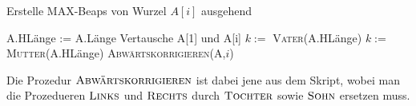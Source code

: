 \begin{solution}
\begin{enumerate}[label = \alph*)]
\begin{algorithm}
  \caption{Erstelle MAX-Beaps von Wurzel $A[i]$ ausgehend}
  \begin{algorithmic}[1]
          \State A.HLänge := A.Länge
          \State Vertausche A[1] und A[i]
          \State $k :=$ \textsc{Vater}(A.HLänge)
            \State $k :=$ \textsc{Mutter}(A.HLänge)
          \EndIf
              \State \textsc{Abwärtskorrigieren(A,$i$)}
            \EndFor
          \EndIf
      \EndProcedure
  \end{algorithmic}
\end{algorithm}

Die Prozedur $\textsc{Abwärtskorrigieren}$ ist dabei jene aus dem Skript, wobei man die Prozedueren $\textsc{Links}$ und $\textsc{Rechts}$ durch $\textsc{Tochter}$ sowie $\textsc{Sohn}$ ersetzen muss.

\end{enumerate}

\end{solution}
